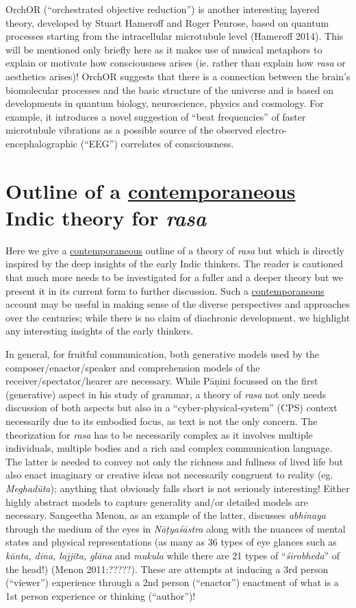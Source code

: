 OrchOR (“orchestrated objective reduction”) is another interesting layered theory, developed by Stuart Hameroff and Roger Penrose, based on quantum processes starting from the intracellular microtubule level (Hameroff 2014). This will be mentioned only briefly here as it makes use of musical metaphors to explain or motivate how consciousness arises (ie. rather than explain how \textsl{rasa} or aesthetics arises)! OrchOR suggests that there is a connection between the brain’s biomolecular processes and the basic structure of the universe and is based on developments in quantum biology, neuroscience, physics and cosmology. For example, it introduces a novel suggestion of “beat frequencies” of faster microtubule vibrations as a possible source of the observed electro-encephalographic (“EEG”) correlates of consciousness.

\section{Outline of a \underline{contemporaneous} Indic theory for \textsl{rasa}}\label{chap3-sec4}

Here we give a \underline{contemporaneous} outline of a theory of \textsl{rasa} but which is directly inspired by the deep insights of the early Indic thinkers. The reader is cautioned that much more needs to be investigated for a fuller and a deeper theory but we present it in its current form to further discussion. Such a \underline{contemporaneous} account may be useful in making sense of the diverse perspectives and approaches over the centuries; while there is no claim of diachronic development, we highlight any interesting insights of the early thinkers.

In general, for fruitful communication, both generative models used by the composer/enactor/speaker and comprehension models of the receiver/spectator/hearer are necessary. While Pāṇini focussed on the first (generative) aspect in his study of grammar, a theory of \textsl{rasa} not only needs discussion of both aspects but also in a “cyber-physical-system” (CPS) context necessarily due to its embodied focus, as text is not the only concern. The theorization for \textsl{rasa} has to be necessarily complex as it involves multiple individuals, multiple bodies and a rich and complex communication language. The latter is needed to convey not only the richness and fullness of lived life but also enact imaginary or creative ideas not necessarily congruent to reality (eg. \textsl{Meghadūta}); anything that obviously falls short is not seriously interesting! Either highly abstract models to capture generality and/or detailed models are necessary. Sangeetha Menon, as an example of the latter, discusses \textsl{abhinaya} through the medium of the eyes in \textsl{Nāṭyaśāstra} along with the nuances of mental states and physical representations (as many as 36 types of eye glances such as \textsl{kānta, dīna, lajjita, glāna} and \textsl{mukula} while there are 21 types of “\textsl{śirobheda}” of the head!) (Menon 2011:?????). These are attempts at inducing a 3rd person (“viewer”) experience through a 2nd person (“enactor”) enactment of what is a 1st person experience or thinking (“author”)!


